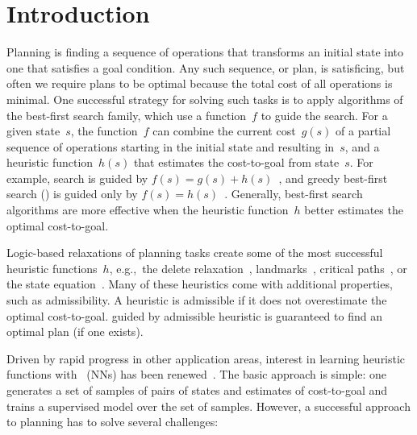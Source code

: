 \chapter{Introduction}
\label{sec:intro}

Planning is finding a sequence of operations that transforms an initial state into one that satisfies a goal condition. Any such sequence, or plan, is satisficing, but often we require plans to be optimal because the total cost of all operations is minimal. One successful strategy for solving such tasks is to apply algorithms of the best-first search family, which use a function~$f$ to guide the search. For a given state~$s$, the function~$f$ can combine the current cost~$g(s)$ of a partial sequence of operations starting in the initial state and resulting in~$s$, and a heuristic function~$h(s)$ that estimates the cost-to-goal from state~$s$. For example, \astar search is guided by $f(s)=g(s)+h(s)$~\cite{hart-et-al-ieeessc1968}, and greedy best-first search (\gbfs) is guided only by $f(s)=h(s)$~\cite{doran-michie-rsl1966}. Generally, best-first search algorithms are more effective when the heuristic function~$h$ better estimates the optimal cost-to-goal.

Logic-based relaxations of planning tasks create some of the most successful heuristic functions~$h$, e.g.,~the delete relaxation~\cite{Hoffmann.Nebel/2001}, landmarks~\cite{hoffmann-et-al-jair2004,Karpas.Domshlak/2009}, critical paths~\cite{haslum-geffner-aips2000}, or the state equation~\cite{bonet-ijcai2013}. Many of these heuristics come with additional properties, such as admissibility. A heuristic is admissible if it does not overestimate the optimal cost-to-goal. \astar guided by admissible heuristic is guaranteed to find an optimal plan (if one exists).

Driven by rapid progress in other application areas, interest in learning heuristic functions with ~(NNs) has been renewed~\cite{samadi-et-al-aaai2008,Arfaee.etal/2011,Agostinelli.etal/2019,Ferber.etal/2020a,Shen.etal/2020,Yu.etal/2020,Toyer.etal/2020,Ferber.etal/2022,OToole/2022}. The basic approach is simple: one generates a set of samples of pairs of states and estimates of cost-to-goal and trains a supervised model over the set of samples. However, a successful approach to planning has to solve several challenges:

